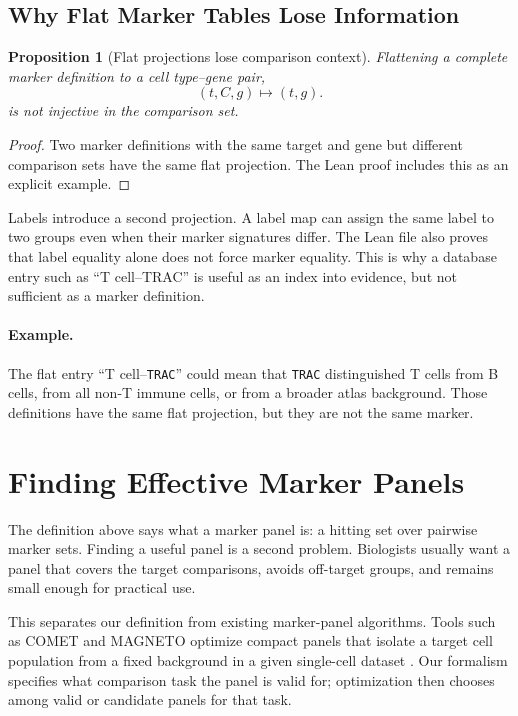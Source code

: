 \documentclass{article}
\newtheorem{proposition}{Proposition}
\begin{document}
\subsection{Why Flat Marker Tables Lose Information}

\begin{proposition}[Flat projections lose comparison context]\label{prop:flat-projection-loss}
Flattening a complete marker definition to a cell type--gene pair,
\[
  (t,C,g)\mapsto(t,g).
\]
is not injective in the comparison set.
\end{proposition}

\begin{proof}
Two marker definitions with the same target and gene but different comparison sets have the same flat projection. The Lean proof includes this as an explicit example.
\end{proof}

Labels introduce a second projection. A label map can assign the same label to two groups even when their marker signatures differ. The Lean file also proves that label equality alone does not force marker equality. This is why a database entry such as ``T cell--TRAC'' is useful as an index into evidence, but not sufficient as a marker definition.

\paragraph{Example.}
The flat entry ``T cell--\texttt{TRAC}'' could mean that \texttt{TRAC} distinguished T cells from B cells, from all non-T immune cells, or from a broader atlas background. Those definitions have the same flat projection, but they are not the same marker.

\section{Finding Effective Marker Panels}

The definition above says what a marker panel is: a hitting set over pairwise marker sets. Finding a useful panel is a second problem. Biologists usually want a panel that covers the target comparisons, avoids off-target groups, and remains small enough for practical use.

This separates our definition from existing marker-panel algorithms. Tools such as COMET and MAGNETO optimize compact panels that isolate a target cell population from a fixed background in a given single-cell dataset \citep{Delaney2019COMET,Tangherloni2022MarkerPanelOptimization,Tangherloni2023MAGNETO}. Our formalism specifies what comparison task the panel is valid for; optimization then chooses among valid or candidate panels for that task.
\end{document}
